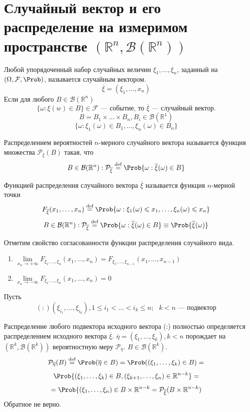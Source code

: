\section{Случайный вектор и его распределение на измеримом пространстве $(\mathbb{R}^n, \mathcal{B}(\mathbb{R}^n))$}
\begin{definition}
	Любой упорядоченный набор случайных величин $\xi_1, \ldots, \xi_n$, заданный на $(\Omega, \mathcal{F}, \Prob)$, называется случайным вектором.
	\[
		\overline{\xi} = (\xi_1, \ldots, x_n)
	\]
	Если для любого $B \in \mathcal{B}(\mathbb{R}^n)$
	\[
		\{ \omega: \xi (w) \in B \} \in \mathcal{F} \text{ --- событие, то $\overline{\xi}$ --- случайный вектор.}
	\]
	\[
		B = B_1 \times \ldots \times B_n, B_i \in \mathcal{B} (\mathbb{R}^1)
	\]
	\[
		\{ \omega : \xi_1 (\omega) \in B_1, \ldots, \xi_n (\omega) \in B_n \}
	\]
\end{definition}
\begin{definition}
	Распределением вероятностей $n$-мерного случайного вектора называется функция множества $\mathcal{P}_{\overline{\xi}} (B)$ такая, что
	\[
		B \in \mathcal{B} (\mathbb{R}^n) : \mathcal{P}_{\overline{\xi}} \overset{\textrm{def}}{=} \Prob \{ \omega : \overline{\xi} (\omega) \in B \}
	\]
\end{definition}
\begin{definition}
	Функцией распределения случайного вектора $\overline{\xi}$ называется функция $n$-мерной точки
	\[
		F_{\overline{\xi}} (x_1, \ldots, x_n) \overset{\textrm{def}}{=} \Prob \{\omega : \xi_1 (\omega) \leqslant x_1, \ldots, \xi_n (\omega) \leqslant x_n \}
	\]
	\[
		B \in \mathcal{B} (\mathbb{R}^n) : \mathcal{P}_{\overline{\xi}} \overset{\textrm{def}}{=} \Prob \{ \omega : \overline{\xi} (\omega) \in B \} \equiv \Prob \{ \overline{\xi} (\omega) \}
	\]
\end{definition}
Отметим свойство согласованности функции распределения случайного вида.
\begin{enumerate}
	\item $\lim\limits_{x_n \to +\infty} F_{\xi_1, \ldots, \xi_n} (x_1, \ldots, x_n) = F_{\xi_1, \ldots, \xi_{n-1}} (x_1, \ldots, x_{n-1})$
	\item $\lim\limits_{x_n \to -\infty} F_{\xi_1, \ldots, \xi_n} (x_1, \ldots, x_n) = 0$
\end{enumerate}
Пусть
\[
 (:) (\xi_{i_1}, \ldots, \xi_{i_k}), 1 \leqslant i_1 < \ldots < i_k \leqslant n; \text{ $k < n$ --- подвектор}
\]
\begin{lemma}
	Распределение любого подвектора исходного вектора (:) полностью определяется распределением исходного вектора $\overline{\xi}$.
	$\overline{\eta} = (\xi_1, \ldots, \xi_k), k < n$ порождает на $(\mathbb{R}^k, \mathcal{B}(\mathbb{R}^k))$ вероятностную меру $\mathcal{P}_{\overline{\eta}}$. $B \in \mathcal{B}(\mathbb{R}^k)$.
\[
		\mathcal{P}_{\overline{\eta}}(B) \overset{\textrm{def}}{=} \Prob(\overline{\eta} \in B) = \Prob ((\xi_1, \ldots, \xi_k) \in B) =
\]
\[
	\Prob \{(\xi_1, \ldots, \xi_k) \in B, (\xi_{k+1}, \ldots, \xi_n) \in \mathbb{R}^{n-k} \} =
\]
\[
	 = \Prob \{(\xi_1, \ldots, \xi_n) \in B \times \mathbb{R}^{n-k} = \mathcal{P}_{\overline{\xi}} (B \times \mathbb{R}^{n-k})
\]
Обратное не верно.
\end{lemma}
